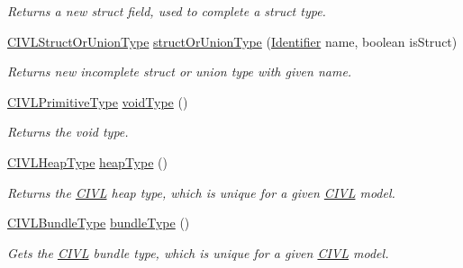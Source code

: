 \begin{DoxyCompactItemize}
\begin{DoxyCompactList}\small\item\em Returns a new struct field, used to complete a struct type. \end{DoxyCompactList}\item 
\hyperlink{interfaceedu_1_1udel_1_1cis_1_1vsl_1_1civl_1_1model_1_1IF_1_1type_1_1CIVLStructOrUnionType}{C\+I\+V\+L\+Struct\+Or\+Union\+Type} \hyperlink{classedu_1_1udel_1_1cis_1_1vsl_1_1civl_1_1model_1_1common_1_1CommonCIVLTypeFactory_a357d07b1707651f6665c8f72c02663a2}{struct\+Or\+Union\+Type} (\hyperlink{interfaceedu_1_1udel_1_1cis_1_1vsl_1_1civl_1_1model_1_1IF_1_1Identifier}{Identifier} name, boolean is\+Struct)
\begin{DoxyCompactList}\small\item\em Returns new incomplete struct or union type with given name. \end{DoxyCompactList}\item 
\hyperlink{interfaceedu_1_1udel_1_1cis_1_1vsl_1_1civl_1_1model_1_1IF_1_1type_1_1CIVLPrimitiveType}{C\+I\+V\+L\+Primitive\+Type} \hyperlink{classedu_1_1udel_1_1cis_1_1vsl_1_1civl_1_1model_1_1common_1_1CommonCIVLTypeFactory_aa8d6db8db663a9e9e4770e5f8af0b5b9}{void\+Type} ()
\begin{DoxyCompactList}\small\item\em Returns the void type. \end{DoxyCompactList}\item 
\hyperlink{interfaceedu_1_1udel_1_1cis_1_1vsl_1_1civl_1_1model_1_1IF_1_1type_1_1CIVLHeapType}{C\+I\+V\+L\+Heap\+Type} \hyperlink{classedu_1_1udel_1_1cis_1_1vsl_1_1civl_1_1model_1_1common_1_1CommonCIVLTypeFactory_aaef4f6719d304a5a15aa4211a79a6935}{heap\+Type} ()
\begin{DoxyCompactList}\small\item\em Returns the \hyperlink{classedu_1_1udel_1_1cis_1_1vsl_1_1civl_1_1CIVL}{C\+I\+V\+L} heap type, which is unique for a given \hyperlink{classedu_1_1udel_1_1cis_1_1vsl_1_1civl_1_1CIVL}{C\+I\+V\+L} model. \end{DoxyCompactList}\item 
\hyperlink{interfaceedu_1_1udel_1_1cis_1_1vsl_1_1civl_1_1model_1_1IF_1_1type_1_1CIVLBundleType}{C\+I\+V\+L\+Bundle\+Type} \hyperlink{classedu_1_1udel_1_1cis_1_1vsl_1_1civl_1_1model_1_1common_1_1CommonCIVLTypeFactory_afa56a9a4ee603374a8efc01c42857a28}{bundle\+Type} ()
\begin{DoxyCompactList}\small\item\em Gets the \hyperlink{classedu_1_1udel_1_1cis_1_1vsl_1_1civl_1_1CIVL}{C\+I\+V\+L} bundle type, which is unique for a given \hyperlink{classedu_1_1udel_1_1cis_1_1vsl_1_1civl_1_1CIVL}{C\+I\+V\+L} model. \end{DoxyCompactList}\item 

\end{DoxyCompactItemize}
